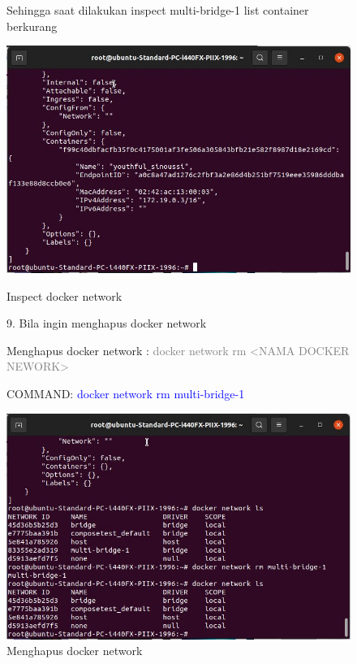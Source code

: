 \begin{figure}
    Sehingga saat dilakukan inspect multi-bridge-1 list container berkurang
    \begin{center}
        \includegraphics[width=\linewidth]{image/61.jpg}
        \caption{Inspect docker network}
        \label{fig:my_figure}
    \end{center}

    9. Bila ingin menghapus docker network 

    Menghapus docker network : \textcolor{Gray}{docker network rm <NAMA DOCKER NEWORK>}

    COMMAND: \textcolor{Blue}{docker network rm multi-bridge-1}
    \begin{center}
        \includegraphics[width=\linewidth]{image/62.jpg}
        \caption{Menghapus docker network}
        \label{fig:my_figure}
    \end{center}
\end{figure}
